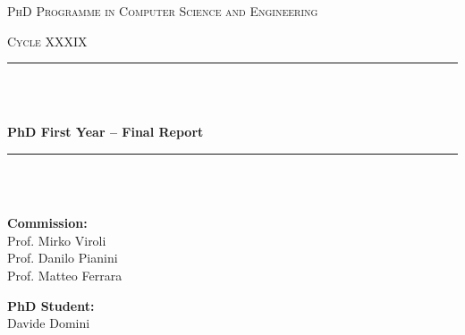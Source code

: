 \documentclass[runningheads]{llncs}
\begin{document}
\begin{titlepage}
    \centering
    \vspace*{2cm}
    
    {\scshape\Large PhD Programme in Computer Science and Engineering \par}
    \vspace{0.5cm}
    {\scshape\large Cycle XXXIX \par}
    \vspace{0.5cm}

    \rule{\linewidth}{0.4mm} \\ [0.1mm]
    \raisebox{0.2cm}{\rule{\linewidth}{0.8mm}} \\[0.8cm]
    {\huge\bfseries PhD First Year -- Final Report \par}
    \vspace{0.8cm}
    \rule{\linewidth}{0.8mm} \\ [0.1pt]
    \raisebox{0.2cm}{\rule{\linewidth}{0.4mm}} \\[1.5cm]
    

    \vspace{1.5cm}
    
    \noindent
    \begin{minipage}[t]{0.45\textwidth}
        \raggedright
        \textbf{Commission:}\\[0.5cm]
        Prof. Mirko Viroli\\
        Prof. Danilo Pianini\\
        Prof. Matteo Ferrara
    \end{minipage}%
    \hfill
    \begin{minipage}[t]{0.45\textwidth}
        \raggedleft
        \textbf{PhD Student:}\\[0.5cm]
        Davide Domini
    \end{minipage}
    
    \vfill
    
\end{titlepage}
\end{document}
